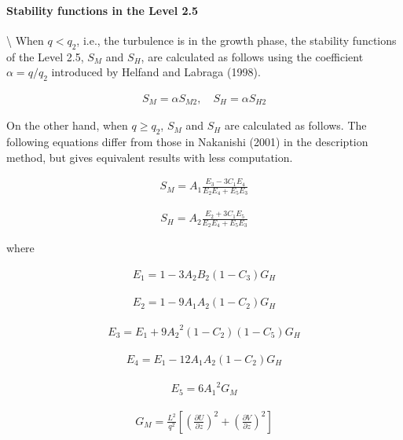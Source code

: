 \hypertarget{stability-functions-in-the-level-2.5}{%
\paragraph{Stability functions in the Level
2.5}\label{stability-functions-in-the-level-2.5}}

\textbackslash{} When \(q<q_2\), i.e., the turbulence is in the growth
phase, the stability functions of the Level 2.5, \(S_M\) and \(S_H\),
are calculated as follows using the coefficient \(\alpha=q/q_2\)
introduced by Helfand and Labraga (1998).

\begin{eqnarray}S_M=\alpha S_{M2},\quad S_H=\alpha S_{H2}\end{eqnarray}

On the other hand, when \(q \geq q_2\), \(S_M\) and \(S_H\) are
calculated as follows. The following equations differ from those in
Nakanishi (2001) in the description method, but gives equivalent results
with less computation.

\begin{eqnarray}S_M=A_1\frac{E_3-3C_1 E_4}{E_2 E_4+E_5 E_3}\end{eqnarray}

\begin{eqnarray}S_H=A_2\frac{E_2+3C_1 E_5}{E_2 E_4+E_5 E_3}\end{eqnarray}

where

\begin{eqnarray}E_1=1-3A_2B_2(1-C_3)G_H\end{eqnarray}

\begin{eqnarray}E_2=1-9A_1A_2(1-C_2)G_H\end{eqnarray}

\begin{eqnarray}E_3=E_1+9{A_2}^2(1-C_2)(1-C_5)G_H\end{eqnarray}

\begin{eqnarray}E_4=E_1-12A_1A_2(1-C_2)G_H\end{eqnarray}

\begin{eqnarray}E_5=6{A_1}^2G_M\end{eqnarray}

\begin{eqnarray}G_M=\frac{L^2}{q^2}\left[\left(\frac{\partial U}{\partial z}\right)^2+\left(\frac{\partial V}{\partial z}\right)^2\right]\end{eqnarray}

